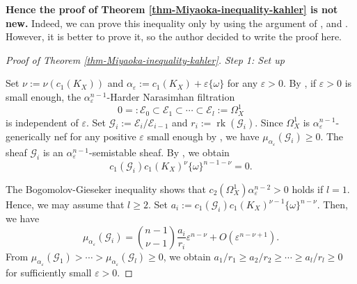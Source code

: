 \documentclass[12pt]{amsart}
\theoremstyle{definition}
\theoremstyle{remark}
\numberwithin{equation}{section}
\newcommand{\rk}[0]{\operatorname{rk}}
\begin{document}
{\bf Hence the proof of Theorem \ref{thm-Miyaoka-inequality-kahler} is  not new.}
Indeed, we can prove this inequality only by using the argument of \cite{Cao13},  \cite{IM22} and \cite{IMM24}. However, it is better to prove it, so the author decided to write the proof here. 



\begin{proof}[Proof of Theorem \ref{thm-Miyaoka-inequality-kahler}]
\text{}

\vspace{0.5\baselineskip}
\emph{Step 1: Set up}
\vspace{0.5\baselineskip}

Set $\nu:=\nu(c_1(K_X))$ and $\alpha_{ \varepsilon }:=c_1(K_X) +  \varepsilon  \{\omega\}$ for any $  \varepsilon  >0$.
By \cite[Proposition 2.3]{Cao13}, if $  \varepsilon  >0$ is small enough,
the $\alpha_{ \varepsilon }^{n-1}$-Harder Narasimhan filtration
$$
0 =: \mathcal{E}_0 \subset \mathcal{E}_1 \subset \cdots \subset \mathcal{E}_l:=\Omega_{X}^{1}
$$
is independent of $  \varepsilon  $.
Set $\mathcal{G}_i := \mathcal{E}_i / \mathcal{E}_{i-1}$ and $r_i := \rk(\mathcal{G}_i)$.
Since $\Omega_{X}^{1}$ is $\alpha_{ \varepsilon }^{n-1} $-generically nef for any 
positive $\varepsilon$ small enough
by \cite{Cao13}, we have $\mu_{\alpha_{ \varepsilon }}(\mathcal{G}_i) \ge 0$.
The sheaf $\mathcal{G}_i$ is an $\alpha_{ \varepsilon }^{n-1}$-semistable sheaf.
By \cite[Claim 6.2]{IM22}, we obtain 
\begin{equation*}
\label{eq-zero}
c_1(\mathcal{G}_i)c_1(K_X)^{\nu}\{\omega\}^{n-1-\nu}  =0.
\end{equation*}

The Bogomolov-Gieseker inequality shows that
$c_2(\Omega_{X}^{1})\alpha_{ \varepsilon }^{n-2}>0$ holds if $l=1$.
Hence, we may assume that $l\ge2$.
Set $a_i := c_1(\mathcal{G}_i)c_1(K_X)^{\nu -1}\{\omega\}^{n-\nu}$.
Then, we have
$$
\mu_{\alpha_{ \varepsilon }}(\mathcal{G}_i)=\binom{n-1}{\nu-1} \frac{a_i}{r_i} \varepsilon ^{n-\nu}+O(\varepsilon ^{n-\nu+1}).
$$
From $\mu_{\alpha_{ \varepsilon }}(\mathcal{G}_1) > \cdots > \mu_{\alpha_{ \varepsilon }}(\mathcal{G}_l)\ge0$,
we obtain $a_1/r_1 \ge a_2/r_2 \ge \cdots \ge a_l/r_l\ge0$
for sufficiently small $ \varepsilon >0$.


\end{proof}
\end{document}
